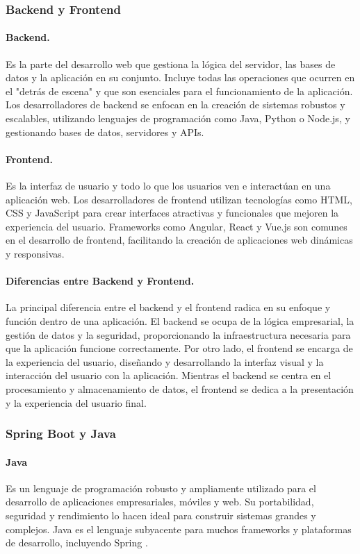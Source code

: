\subsubsection{Backend y Frontend}
\paragraph{Backend.}
Es la parte del desarrollo web que gestiona la lógica del servidor, las bases de datos y la aplicación en su conjunto. Incluye todas las operaciones que ocurren en el "detrás de escena" y que son esenciales para el funcionamiento de la aplicación. Los desarrolladores de backend se enfocan en la creación de sistemas robustos y escalables, utilizando lenguajes de programación como Java, Python o Node.js, y gestionando bases de datos, servidores y APIs.

\paragraph{Frontend.}
Es la interfaz de usuario y todo lo que los usuarios ven e interactúan en una aplicación web. Los desarrolladores de frontend utilizan tecnologías como HTML, CSS y JavaScript para crear interfaces atractivas y funcionales que mejoren la experiencia del usuario. Frameworks como Angular, React y Vue.js son comunes en el desarrollo de frontend, facilitando la creación de aplicaciones web dinámicas y responsivas.

\paragraph{Diferencias entre Backend y Frontend.}
La principal diferencia entre el backend y el frontend radica en su enfoque y función dentro de una aplicación. El backend se ocupa de la lógica empresarial, la gestión de datos y la seguridad, proporcionando la infraestructura necesaria para que la aplicación funcione correctamente. Por otro lado, el frontend se encarga de la experiencia del usuario, diseñando y desarrollando la interfaz visual y la interacción del usuario con la aplicación. Mientras el backend se centra en el procesamiento y almacenamiento de datos, el frontend se dedica a la presentación y la experiencia del usuario final.

\subsubsection{Spring Boot y Java}
\paragraph{Java}
Es un lenguaje de programación robusto y ampliamente utilizado para el desarrollo de aplicaciones empresariales, móviles y web. Su portabilidad, seguridad y rendimiento lo hacen ideal para construir sistemas grandes y complejos. Java es el lenguaje subyacente para muchos frameworks y plataformas de desarrollo, incluyendo Spring .

